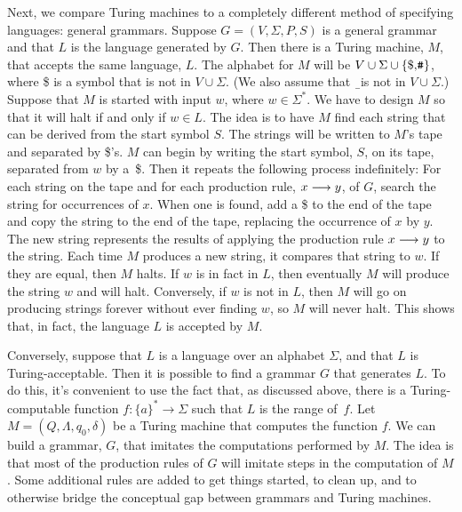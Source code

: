 \medbreak

Next, we compare Turing machines to a completely different method
of specifying languages: general grammars.  Suppose $G=(V,\Sigma,P,S)$ is a general
grammar and that $L$ is the language
generated by $G$.  Then there is a Turing machine, $M$, that accepts
the same language, $L$.  The alphabet for $M$ will be $V\cup\Sigma\cup\{\text{\$,{\tt\#}}\}$,
where \$ is a symbol that is not in $V\cup\Sigma$. (We also assume that \b\ is not in $V\cup\Sigma$.)
Suppose that $M$ is started with input $w$, where $w\in\Sigma^*$.
We have to design $M$ so that it will halt if and only if $w\in L$.
The idea is to have $M$ find each string that can be derived
from the start symbol $S$.  The strings will be written to $M$'s tape
and separated by \$'s.  $M$ can begin by writing the start symbol,
$S$, on its tape, separated from $w$ by a~\$.  Then it repeats
the following process indefinitely:  For each string on the tape
and for each production rule, $x\longrightarrow y$, of $G$, search the
string for occurrences of $x$.  When one is found, add a \$ to the
end of the tape and copy the string to the end of the tape, replacing
the occurrence of $x$ by $y$.  The new string represents the results
of applying the production rule $x\longrightarrow y$ to the string.
Each time $M$ produces a new string, it compares
that string to $w$.  If they are equal, then $M$ halts.  If $w$ is
in fact in $L$, then eventually $M$ will produce the string $w$ and
will halt.  Conversely, if $w$ is not in $L$, then $M$ will go on producing
strings forever without ever finding $w$, so $M$ will never halt.
This shows that, in fact, the language $L$ is accepted by $M$.

Conversely, suppose that $L$ is a language over an alphabet $\Sigma$,
and that $L$ is Turing-acceptable.  Then it is possible to find a grammar
$G$ that generates $L$.  To do this, it's convenient to use the
fact that, as discussed above, there is a Turing-computable function
$f\colon \{a\}^*\to\Sigma$ such that $L$ is the range of~$f$.
Let $M=(Q,\Lambda,q_0,\delta)$ be a Turing machine that computes
the function $f$.  We can build a grammar, $G$, that imitates the computations
performed by $M$.  The idea is that most of the production rules of $G$ will
imitate steps in the computation of $M$.  Some additional rules are added
to get things started, to clean up, and to otherwise bridge the
conceptual gap between grammars and Turing machines.


